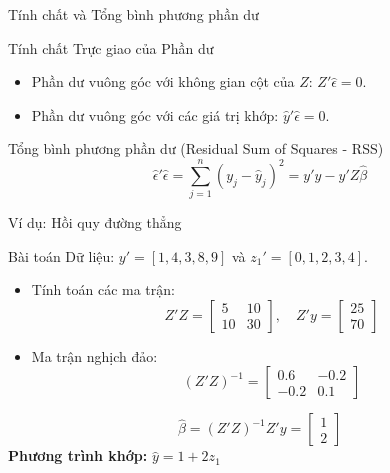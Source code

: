 \begin{frame}{Tính chất và Tổng bình phương phần dư}
    \begin{block}{Tính chất Trực giao của Phần dư}
        \begin{itemize}
            \item Phần dư vuông góc với không gian cột của $Z$: $Z'\hat{\epsilon}=0$.
            \item Phần dư vuông góc với các giá trị khớp: $\hat{y}'\hat{\epsilon}=0$.
        \end{itemize}
    \end{block}

    \pause
    \begin{alertblock}{Tổng bình phương phần dư (Residual Sum of Squares - RSS)}
        \[
            \hat{\epsilon}'\hat{\epsilon}
            = \sum_{j=1}^{n} (y_j - \hat{y}_j)^2
            = y'y - y'Z\hat{\beta}
        \]
    \end{alertblock}
\end{frame}

\begin{frame}{Ví dụ: Hồi quy đường thẳng}
    \begin{exampleblock}{Bài toán}
        Dữ liệu: $y' = [1, 4, 3, 8, 9]$ và $z_1' = [0, 1, 2, 3, 4]$.
        \begin{itemize}
            \item Tính toán các ma trận:
            \[
            Z'Z = \begin{bmatrix} 5 & 10 \\ 10 & 30 \end{bmatrix}, \quad
            Z'y = \begin{bmatrix} 25 \\ 70 \end{bmatrix}
            \]
            \item Ma trận nghịch đảo:
            \[
            (Z'Z)^{-1} = \begin{bmatrix} 0.6 & -0.2 \\ -0.2 & 0.1 \end{bmatrix}
            \]
        \end{itemize}
        \pause
        \[
            \hat{\beta} = (Z'Z)^{-1}Z'y =
            \begin{bmatrix} 1 \\ 2 \end{bmatrix}
        \]
        \textbf{Phương trình khớp:} $\hat{y} = 1 + 2z_1$
    \end{exampleblock}
\end{frame}

